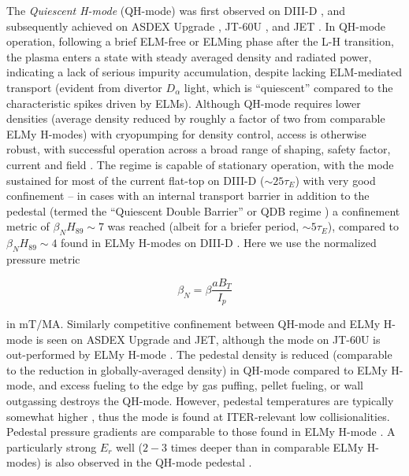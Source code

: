 The \emph{Quiescent H-mode} (QH-mode) was first observed on DIII-D \cite{Burrell2002,Groebner2001}, and subsequently achieved on ASDEX Upgrade \cite{Suttrop2003a}, JT-60U \cite{Sakamoto2004}, and JET \cite{Suttrop2005}.  In QH-mode operation, following a brief ELM-free or ELMing phase after the L-H transition, the plasma enters a state with steady averaged density and radiated power, indicating a lack of serious impurity accumulation, despite lacking ELM-mediated transport (evident from divertor $D_\alpha$ light, which is ``quiescent'' compared to the characteristic spikes driven by ELMs).  Although QH-mode requires lower densities (average density reduced by roughly a factor of two from comparable ELMy H-modes) with cryopumping for density control, access is otherwise robust, with successful operation across a broad range of shaping, safety factor, current and field \cite{Burrell2002}.  The regime is capable of stationary operation, with the mode sustained for most of the current flat-top on DIII-D ($\sim 
25 \tau_E$) with very good confinement -- in cases with an internal transport barrier in addition to the pedestal (termed the ``Quiescent Double Barrier'' or QDB regime \cite{Burrell2001,Doyle2001,Greenfield2002}) a confinement metric of $\beta_N H_{89} \sim 7$ was reached (albeit for a briefer period, $\sim 5 \tau_E$), compared to $\beta_N H_{89} \sim 4$ found in ELMy H-modes on DIII-D \cite{Doyle2001}.  Here we use the normalized pressure metric \cite{Troyon1984}

\begin{equation}\label{eq:betan}
 \beta_N = \beta \frac{aB_T}{I_p}
\end{equation}

\noindent in $\si{\meter\tesla\per\mega\ampere}$.  Similarly competitive confinement between QH-mode and ELMy H-mode is seen on ASDEX Upgrade and JET, although the mode on JT-60U is out-performed by ELMy H-mode \cite{Oyama2006}.  The pedestal density is reduced (comparable to the reduction in globally-averaged density) in QH-mode compared to ELMy H-mode, and excess fueling to the edge by gas puffing, pellet fueling, or wall outgassing destroys the QH-mode.  However, pedestal temperatures are typically somewhat higher \cite{Doyle2001}, thus the mode is found at ITER-relevant low collisionalities.  Pedestal pressure gradients are comparable to those found in ELMy H-mode \cite{Burrell2002}.  A particularly strong $E_r$ well ($2-3$ times deeper than in comparable ELMy H-modes) is also observed in the QH-mode pedestal \cite{Greenfield2002}.

